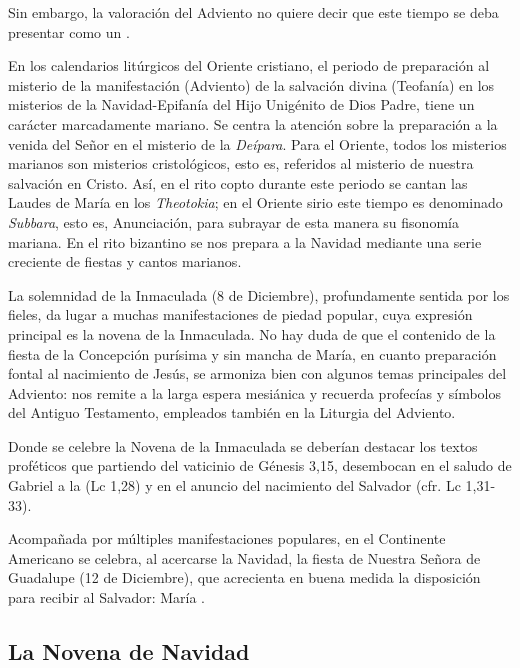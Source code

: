\begin{introstyle}
	Sin embargo, la valoración del Adviento  no quiere decir que este tiempo se deba presentar como un .
	
	En los calendarios litúrgicos del Oriente cristiano, el periodo de preparación al misterio de la manifestación (Adviento) de la salvación	divina (Teofanía) en los misterios de la Navidad-Epifanía del Hijo Unigénito de Dios Padre, tiene un carácter marcadamente mariano. Se
	centra la atención sobre la preparación a la venida del Señor en el	misterio de la \emph{Deípara}. Para el Oriente, todos los misterios marianos son misterios cristológicos, esto es, referidos al misterio de nuestra salvación en Cristo. Así, en el rito copto durante este periodo se cantan las Laudes de María en los \emph{Theotokia}; en el Oriente sirio este tiempo es denominado \emph{Subbara}, esto es, Anunciación, para subrayar de esta manera su fisonomía mariana. En el rito bizantino	se nos prepara a la Navidad mediante una serie creciente de fiestas y cantos marianos.
	
	La solemnidad de la Inmaculada (8 de Diciembre), profundamente	sentida por los fieles, da lugar a muchas manifestaciones de piedad popular, cuya expresión principal es la novena de la Inmaculada. No hay duda de que el contenido de la fiesta de la Concepción purísima y sin mancha de María, en cuanto preparación fontal al nacimiento de Jesús, se armoniza bien con algunos temas principales del Adviento: nos remite a la larga espera mesiánica y recuerda profecías y símbolos del Antiguo Testamento, empleados también en la Liturgia del Adviento.
	
	Donde se celebre la Novena de la Inmaculada se deberían destacar los textos proféticos que partiendo del vaticinio de Génesis 3,15, desembocan en el saludo de Gabriel a la  (Lc 1,28) y	en el anuncio del nacimiento del Salvador (cfr. Lc 1,31-33).
	
	Acompañada por múltiples manifestaciones populares, en el Continente Americano se celebra, al acercarse la Navidad, la fiesta de Nuestra Señora de Guadalupe (12 de Diciembre), que acrecienta en buena medida la disposición para recibir al Salvador: María .
	
	
	\subsection{La Novena de Navidad}
	

\end{introstyle}
